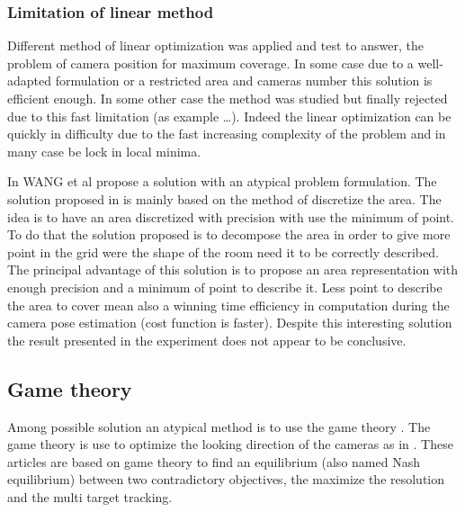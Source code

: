 \subsubsection{	Limitation of linear method}
Different method of linear optimization was applied and test to answer, the problem of camera position for maximum coverage. In some case due to a well-adapted formulation or a restricted area and cameras number this solution is efficient enough. In some other case the method was studied but finally rejected due to this fast limitation (as example \cite{141*akbarzadeh2013,151*zhao2013,82*chrysostomou2012} …). Indeed the linear optimization can be quickly in difficulty due to the fast increasing complexity of the problem and in many case be lock in local minima.

	
In WANG et al \cite{181*wang2017} propose a solution with an atypical problem formulation. The solution proposed in \cite{181*wang2017} is mainly based on the method of discretize the area. The idea is to have an area discretized with precision with use the minimum of point. To do that the solution proposed is to decompose the area in order to give more point in the grid were the shape of the room need it to be correctly described. \\
The principal advantage of this solution is to propose an area representation with enough precision and a minimum of point to describe it. Less point to describe the area to cover mean also a winning time efficiency in computation during the camera pose estimation (cost function is faster).
Despite this interesting solution the result presented in the experiment does not appear to be conclusive. \\
	
\subsection{Game theory} 
	 
Among possible solution an atypical method is to use the game theory \cite{19*li2013}. The game theory is use to optimize the looking direction of the cameras as in \cite{12*soto2009,18*ding2012,19*li2013,25*song2008}. These articles are based on game theory to find an equilibrium (also named Nash equilibrium) between two contradictory objectives, the maximize the resolution and the multi target tracking.\\

